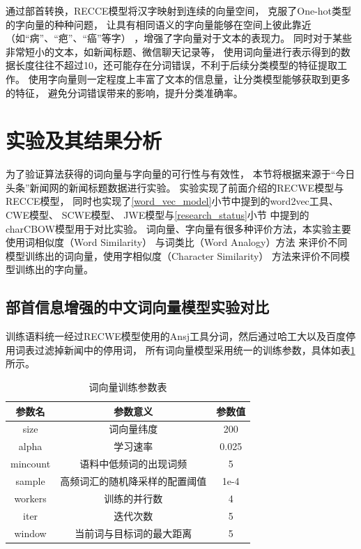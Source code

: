 通过部首转换，RECCE模型将汉字映射到连续的向量空间，
克服了One-hot类型的字向量的种种问题，
让具有相同语义的字向量能够在空间上彼此靠近（如“病”、“疤”、“癌”等字）
，增强了字向量对于文本的表现力。
同时对于某些非常短小的文本，如新闻标题、微信聊天记录等，
使用词向量进行表示得到的数据长度往往不超过10，还可能存在分词错误，不利于后续分类模型的特征提取工作。
使用字向量则一定程度上丰富了文本的信息量，让分类模型能够获取到更多的特征，
避免分词错误带来的影响，提升分类准确率。

\section{实验及其结果分析}
为了验证算法获得的词向量与字向量的可行性与有效性，
本节将根据来源于“今日头条”新闻网的新闻标题数据进行实验。
实验实现了前面介绍的RECWE模型与RECCE模型，
同时也实现了\ref{word_vec_model}小节中提到的word2vec工具、
CWE模型、
SCWE模型、
JWE模型与\ref{research_status}小节
中提到的charCBOW模型用于对比实验。
词向量、字向量有很多种评价方法，本实验主要使用词相似度（Word Similarity）
与词类比（Word Analogy）方法
来评价不同模型训练出的词向量，使用字相似度（Character Similarity）
方法来评价不同模型训练出的字向量。
\subsection{部首信息增强的中文词向量模型实验对比}
训练语料统一经过RECWE模型使用的Ansj工具分词，然后通过哈工大以及百度停用词表过滤掉新闻中的停用词，
所有词向量模型采用统一的训练参数，具体如表\ref{word_vec_arg_form}所示。
\begin{table}[h]
    \caption{词向量训练参数表}
    \begin{tabular}{|c|c|c|}
        \hline
        参数名 & 参数意义 & 参数值 \\
        \hline
        size & 词向量纬度 & 200 \\
        \hline
        alpha & 学习速率 & 0.025 \\
        \hline
        mincount & 语料中低频词的出现词频 & 5 \\
        \hline
        sample & 高频词汇的随机降采样的配置阈值 & 1e-4 \\
        \hline
        workers & 训练的并行数 & 4 \\
        \hline
        iter & 迭代次数 & 5 \\
        \hline
        window & 当前词与目标词的最大距离 & 5 \\
        \hline
    \end{tabular}
    \label{word_vec_arg_form}
    \end{table}

